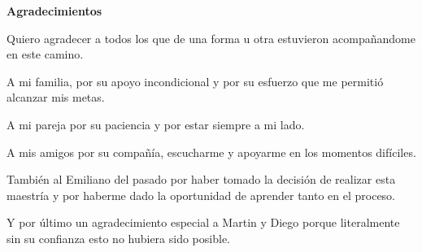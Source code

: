 \begin{center}
    \Large\bfseries Agradecimientos
\end{center}
\vspace{1cm}

Quiero agradecer a todos los que de una forma u otra estuvieron acompañandome en este camino.\newline

A mi familia, por su apoyo incondicional y por su esfuerzo que me permitió alcanzar mis metas.\newline

A mi pareja por su paciencia y por estar siempre a mi lado. \newline

A mis amigos por su compañía, escucharme y apoyarme en los momentos difíciles. \newline

También al Emiliano del pasado por haber tomado la decisión de 
realizar esta maestría y por haberme dado la oportunidad de aprender tanto en el proceso. \newline

Y por último un agradecimiento especial a Martin y Diego porque 
literalmente sin su confianza esto no hubiera sido posible.
\newpage